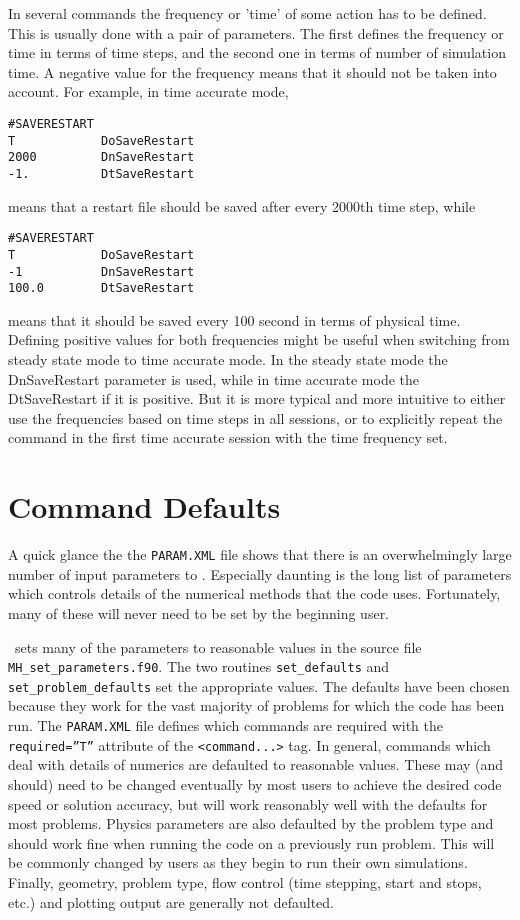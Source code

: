 In several commands the frequency or 'time' of some action has
to be defined. This is usually done with a pair of parameters.
The first defines the frequency or time in terms of time steps,
and the second one in terms of number of simulation time.
A negative value for the frequency means that it should not be taken 
into account. For example, in time accurate mode,
\begin{verbatim}
#SAVERESTART
T            DoSaveRestart
2000         DnSaveRestart
-1.          DtSaveRestart
\end{verbatim}
means that a restart file should be saved after every 2000th time step, while
\begin{verbatim}
#SAVERESTART
T            DoSaveRestart
-1           DnSaveRestart
100.0        DtSaveRestart
\end{verbatim}
means that it should be saved every 100 second in terms of physical time.
Defining positive values for both frequencies might be useful
when switching from steady state mode to time accurate mode.
In the steady state mode the DnSaveRestart parameter is used,
while in time accurate mode the DtSaveRestart if it is positive.
But it is more typical and more intuitive to either 
use the frequencies based on time steps in all sessions, 
or to explicitly repeat the command in the first 
time accurate session with the time frequency set.

\section{Command Defaults \label{section:defaults}}

A quick glance the the {\tt PARAM.XML} file shows that there is an 
overwhelmingly large number of input parameters to \BATSRUS.  
Especially daunting is the long
list of parameters which controls details of the numerical methods that the
code uses.  Fortunately, many of these will never need to be set by the 
beginning user.  

\BATSRUS\ sets many of the parameters to reasonable values in the source file 
{\tt MH\_set\_parameters.f90}.  The two routines
{\tt set\_defaults} and {\tt set\_problem\_defaults} set 
the appropriate values.
The defaults have been chosen because they work for the vast
majority of problems for which the code has been run.  
The {\tt PARAM.XML} file defines which commands are required
with the {\tt required=''T''} attribute of the {\tt <command...>} tag.
In general, commands which deal with details of numerics are defaulted to 
reasonable values.
These may (and should) need to be changed eventually by most users 
to achieve the desired code speed or solution accuracy, but will
work reasonably well with the defaults for most problems.
Physics parameters are also defaulted by the problem type and should work fine
when running the code on a previously run problem.  
This will be commonly changed by users as they begin to run their 
own simulations. Finally, geometry, problem type,
flow control (time stepping, start and stops, etc.) and plotting output 
are generally not defaulted.

